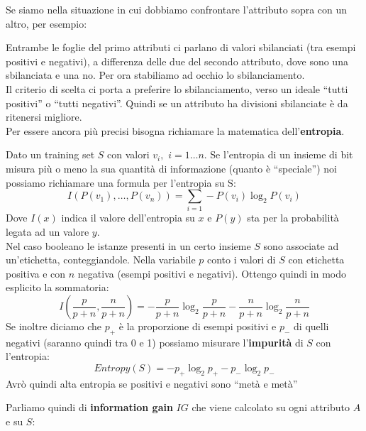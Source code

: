 \documentclass[a4paper,12pt, oneside]{book}
\begin{document}
Se siamo nella situazione in cui dobbiamo confrontare l'attributo sopra con un
altro, per esempio:
\begin{figure}[H]
  \centering
\end{figure}
Entrambe le foglie del primo attributi ci parlano di valori sbilanciati (tra
esempi positivi e negativi), a differenza delle due del secondo attributo, dove
sono una sbilanciata e una no. Per ora stabiliamo ad occhio lo sbilanciamento.\\
Il criterio di scelta ci porta a preferire lo sbilanciamento, verso un ideale
``tutti positivi'' o ``tutti negativi''. Quindi se un attributo ha divisioni
sbilanciate è da ritenersi migliore.\\ 
Per essere ancora più precisi bisogna richiamare la matematica
dell'\textbf{entropia}.
\begin{definizione}
  Dato un training set $S$ con valori $v_i,\,\,i=1\ldots n$. Se l'entropia di un
  insieme di bit misura più o meno la sua quantità di informazione (quanto è
  ``speciale'') noi possiamo richiamare una formula per l'entropia su S:
  \[I(P(v_1),\ldots,P(v_n))=\sum_{i=1}-P(v_i)\log_2P(v_i)\]
  Dove $I(x)$ indica il valore dell'entropia su $x$ e $P(y)$ sta per la
  probabilità legata ad un valore $y$.  \\
  Nel caso booleano le istanze presenti in un certo insieme $S$ sono associate
  ad un'etichetta, conteggiandole. Nella variabile $p$ conto i valori di $S$ con
  etichetta positiva e con $n$ negativa (esempi positivi e negativi). Ottengo
  quindi in modo esplicito la sommatoria:
  \[I\left(\frac{p}{p+n},\frac{n}{p+n}\right)=-\frac{p}{p+n}\log_2\frac{p}{p+n}
    -\frac{n}{p+n}\log_2\frac{n}{p+n}\]  
  Se inoltre diciamo che $p_+$ è la proporzione di esempi positivi e $p_-$ di
  quelli negativi (saranno quindi tra 0 e 1) possiamo misurare
  l'\textbf{impurità} di $S$ con l'entropia: 
  \[Entropy(S)=-p_+\log_2 p_+-p_-\log_2 p_-\]
  Avrò quindi alta entropia se positivi e negativi sono ``metà e metà''
\end{definizione}
Parliamo quindi di \textbf{information gain} $IG$ che viene calcolato su ogni
attributo $A$ e su $S$:
\end{document}
